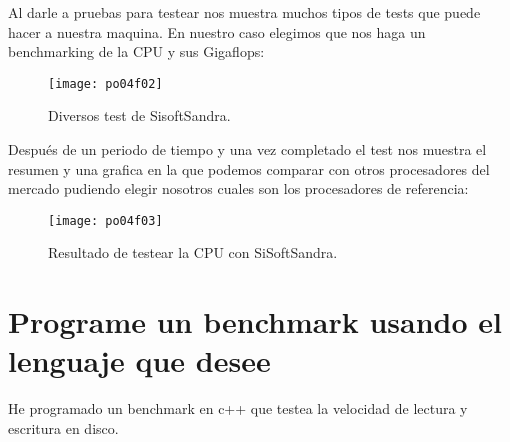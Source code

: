 Al darle a pruebas para testear nos muestra muchos tipos de tests que puede hacer a nuestra maquina. En nuestro caso elegimos que nos haga un benchmarking de la CPU y sus Gigaflops:

\begin{figure}[H]
	\centering
	\texttt{[image: po04f02]}
	\caption{Diversos test de SisoftSandra.}
	\label{fig:po04f02}
\end{figure}

\clearpage
Después de un periodo de tiempo y una vez completado el test nos muestra el resumen y una grafica en la que podemos comparar con otros procesadores del mercado pudiendo elegir nosotros cuales son los procesadores de referencia:

\begin{figure}[H]
	\centering
	\texttt{[image: po04f03]}
	\caption{Resultado de testear la CPU con SiSoftSandra.}
	\label{fig:po04f03}
\end{figure}


\clearpage
\section{Programe un benchmark usando el lenguaje que desee}

He programado un benchmark en c++ que testea la velocidad de lectura y escritura en disco.

